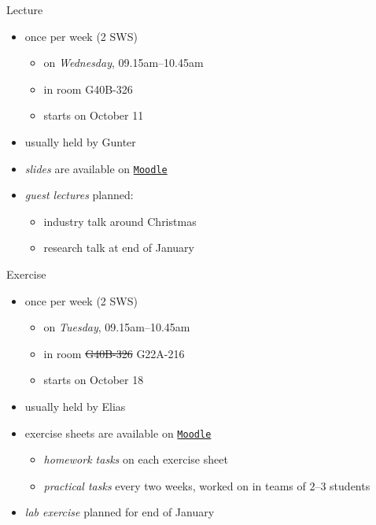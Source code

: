 \begin{frame}{\myframetitle}
	\begin{mycolumns}
		\begin{definition}{Lecture}
			\begin{itemize}
				\item once per week (2 SWS)
				\begin{itemize}
					\item on \emph{Wednesday}, 09.15am--10.45am
					\item in room G40B-326
					\item starts on October 11
				\end{itemize}
				\item usually held by Gunter
				\item \emph{slides} are available on \texttt{\href{https://elearning.ovgu.de/course/view.php?id=13228}{Moodle}}
				\item \emph{guest lectures} planned:
				\begin{itemize}
					\item industry talk around Christmas
					\item research talk at end of January
				\end{itemize}
			\end{itemize}
		\end{definition}
	\mynextcolumn
		\begin{example}{Exercise}
			\begin{itemize}
				\item once per week (2 SWS)
				\begin{itemize}
					\item on \emph{Tuesday}, 09.15am--10.45am
					\item in room \sout{G40B-326} G22A-216
					\item starts on October 18
				\end{itemize}
				\item usually held by Elias
				\item exercise sheets are available on \texttt{\href{https://elearning.ovgu.de/course/view.php?id=13228}{Moodle}}
				\begin{itemize}
					\item \emph{homework tasks} on each exercise sheet
					\item \emph{practical tasks} every two weeks, worked on in teams of $2$--$3$ students
				\end{itemize}
				\item \emph{lab exercise} planned for end of January
			\end{itemize}
		\end{example}
	\end{mycolumns}
\end{frame}

